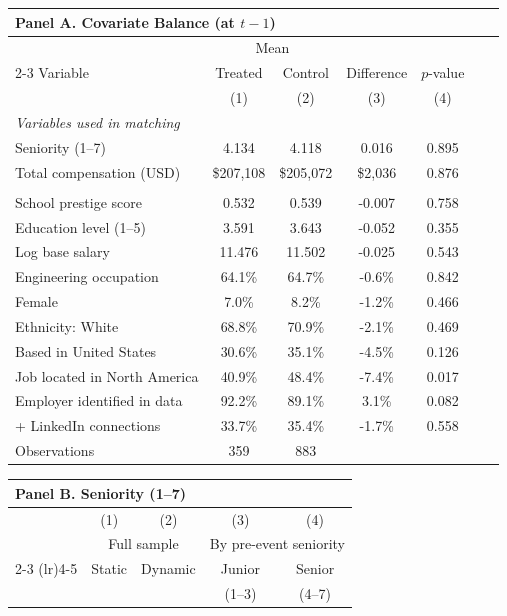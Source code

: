 \begin{center}
\begin{table}
\begin{tabular}{lcccccc}
\multicolumn{5}{l}{\textbf{Panel A. Covariate Balance (at $t-1$)}} \\[2pt]
\toprule
 & \multicolumn{2}{c}{Mean} & & & & \\
\cmidrule(lr){2-3}
Variable & Treated & Control & Difference  & $p$-value \\
 & (1) & (2) & (3) & (4) \\
\midrule
\multicolumn{7}{l}{\textit{Variables used in matching}} \\
\quad Seniority (1--7) & 4.134 & 4.118 & 0.016 &  0.895 \\
\quad Total compensation (USD) & \$207,108 & \$205,072 & \$2,036 &  0.876 \\
\addlinespace
\multicolumn{7}{l}{\textit{Variables not used in matching}} \\
\quad School prestige score & 0.532 & 0.539 & -0.007 &  0.758 \\
\quad Education level (1--5) & 3.591 & 3.643 & -0.052 &  0.355 \\
\quad Log base salary & 11.476 & 11.502 & -0.025 &  0.543 \\
\quad Engineering occupation & 64.1\% & 64.7\% & -0.6\% &  0.842 \\
\quad Female & 7.0\% & 8.2\% & -1.2\% &  0.466 \\
\quad Ethnicity: White & 68.8\% & 70.9\% & -2.1\% &  0.469 \\
\quad Based in United States & 30.6\% & 35.1\% & -4.5\% &  0.126 \\
\quad Job located in North America & 40.9\% & 48.4\% & -7.4\% &  0.017 \\
\quad Employer identified in data & 92.2\% & 89.1\% & 3.1\% &  0.082 \\
\quad 500+ LinkedIn connections & 33.7\% & 35.4\% & -1.7\% &  0.558 \\
\midrule
Observations & 359 & 883 & &  \\
\bottomrule
\end{tabular}
\vspace{10pt}
\begin{tabular}{lcccc}
\multicolumn{5}{l}{\textbf{Panel B. Seniority (1--7)}} \\[2pt]
\toprule
 & (1) & (2) & (3) & (4) \\
 & \multicolumn{2}{c}{Full sample} & \multicolumn{2}{c}{By pre-event seniority} \\
\cmidrule(lr){2-3} \cmidrule(lr){4-5}
 & Static & Dynamic & Junior & Senior \\
 & & & \small(1--3) & \small(4--7) \\

\end{tabular}
\end{table}
\end{center}
